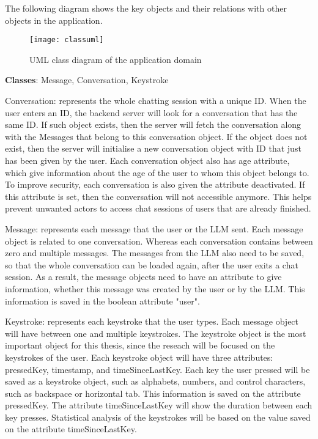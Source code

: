 The following diagram shows the key objects and their relations with other objects in the application.

\begin{figure}[h!]
    \centering
    \texttt{[image: classuml]}
    \caption{UML class diagram of the application domain}
\end{figure}

\textbf{Classes}: Message, Conversation, Keystroke

Conversation: represents the whole chatting session with a unique ID.
When the user enters an ID, the backend server will look for a conversation that has the same ID.
If such object exists, then the server will fetch the conversation along with the Messages that belong to this conversation object.
If the object does not exist, then the server will initialise a new conversation object with ID that just has been given by the user.
Each conversation object also has age attribute, which give information about the age of the user to whom this object belongs to.
To improve security, each conversation is also given the attribute deactivated.
If this attribute is set, then the conversation will not accessible anymore.
This helps prevent unwanted actors to access chat sessions of users that are already finished.

Message: represents each message that the user or the \ac{LLM} sent.
Each message object is related to one conversation.
Whereas each conversation contains between zero and multiple messages.
The messages from the \ac{LLM} also need to be saved, so that the whole conversation can be loaded again, after the user exits a chat session.
As a result, the message objects need to have an attribute to give information, whether this message was created by the user or by the \ac{LLM}.
This information is saved in the boolean attribute "user".

Keystroke: represents each keystroke that the user types.
Each message object will have between one and multiple keystrokes.
The keystroke object is the most important object for this thesis, since the reseach will be focused on the keystrokes of the user.
Each keystroke object will have three attributes: pressedKey, timestamp, and timeSinceLastKey.
Each key the user pressed will be saved as a keystroke object, such as alphabets, numbers, and control characters, such as backspace or horizontal tab.
This information is saved on the attribute pressedKey.
The attribute timeSinceLastKey will show the duration between each key presses.
Statistical analysis of the keystrokes will be based on the value saved on the attribute timeSinceLastKey. 

